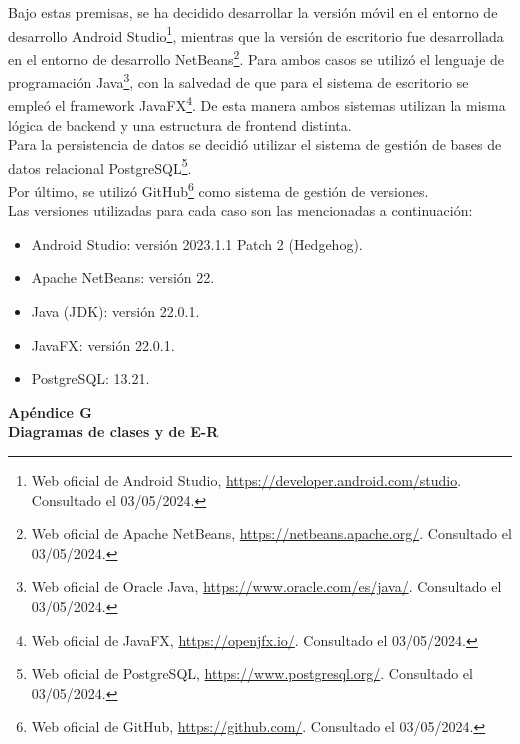 \documentclass[a4paper, 12pt,twoside]{report}  %
\numberwithin{equation}{subsection} %
\begin{document}
\indent Bajo estas premisas, se ha decidido desarrollar la versión móvil en el entorno de desarrollo Android Studio\footnote{Web oficial de Android Studio, \url{https://developer.android.com/studio}. Consultado el 03/05/2024.}, mientras que la versión de escritorio fue desarrollada en el entorno de desarrollo NetBeans\footnote{Web oficial de Apache NetBeans, \url{https://netbeans.apache.org/}. Consultado el 03/05/2024.}. Para ambos casos se utilizó el lenguaje de programación Java\footnote{Web oficial de Oracle Java, \url{https://www.oracle.com/es/java/}. Consultado el 03/05/2024.}, con la salvedad de que para el sistema de escritorio se empleó el framework JavaFX\footnote{Web oficial de JavaFX, \url{https://openjfx.io/}. Consultado el 03/05/2024.}. De esta manera ambos sistemas utilizan la misma lógica de backend y una estructura de frontend distinta.\\
\indent Para la persistencia de datos se decidió utilizar el sistema de gestión de bases de datos relacional PostgreSQL\footnote{Web oficial de PostgreSQL, \url{https://www.postgresql.org/}. Consultado el 03/05/2024.}.\\
\indent Por último, se utilizó GitHub\footnote{Web oficial de GitHub, \url{https://github.com/}. Consultado el 03/05/2024.} como sistema de gestión de versiones.\\
Las versiones utilizadas para cada caso son las mencionadas a continuación:
\begin{itemize}
	\item Android Studio: versión 2023.1.1 Patch 2 (Hedgehog).
	\item Apache NetBeans: versión 22.
	\item Java (JDK): versión 22.0.1.
	\item JavaFX: versión 22.0.1.
	\item PostgreSQL: 13.21.
\end{itemize}




\clearpage
{}
{
	\centering
	\vspace*{\fill}
	\Huge \hypertarget{apendice_g}{}\textbf{Apéndice G}\\[1em]
	\Huge \textbf{Diagramas de clases y de E-R}\\[1em]
	\vspace*{\fill}
	\par
}
\end{document}
